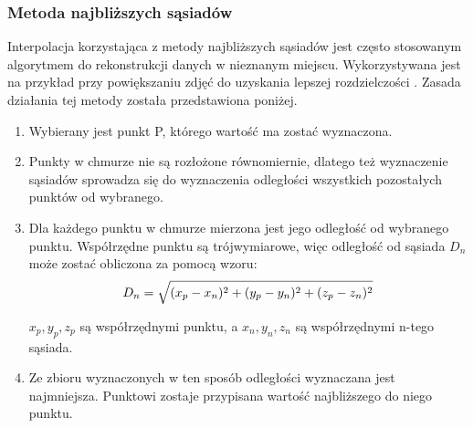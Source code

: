 \subsubsection{Metoda najbliższych sąsiadów}
Interpolacja korzystająca z metody najbliższych sąsiadów jest często stosowanym algorytmem do rekonstrukcji danych w nieznanym miejscu. Wykorzystywana jest na przykład przy powiększaniu zdjęć do uzyskania lepszej rozdzielczości \cite{han2013comparison}. Zasada działania tej metody została przedstawiona poniżej.
\begin{enumerate}
    \item Wybierany jest punkt P, którego wartość ma zostać wyznaczona.
    \item Punkty w chmurze nie są rozłożone równomiernie, dlatego też wyznaczenie sąsiadów sprowadza się do wyznaczenia odległości wszystkich pozostałych punktów od wybranego.
    \item Dla każdego punktu w chmurze mierzona jest jego odległość od wybranego punktu. Współrzędne punktu są trójwymiarowe, więc odległość od sąsiada $D_{n}$ może zostać obliczona za pomocą wzoru:
    \begin{equation}
             D_{n}=\sqrt{(x_{p}-x_{n})^2+(y_{p}-y_{n})^2+(z_{p}-z_{n})^2}    \\
    \end{equation}
    
$x_{p},y_{p},z_{p}$ są współrzędnymi punktu, a $x_{n},y_{n},z_{n}$ są współrzędnymi n-tego sąsiada.
    \item Ze zbioru wyznaczonych w ten sposób odległości wyznaczana jest najmniejsza. Punktowi zostaje przypisana wartość najbliższego do niego punktu.
\end{enumerate}
